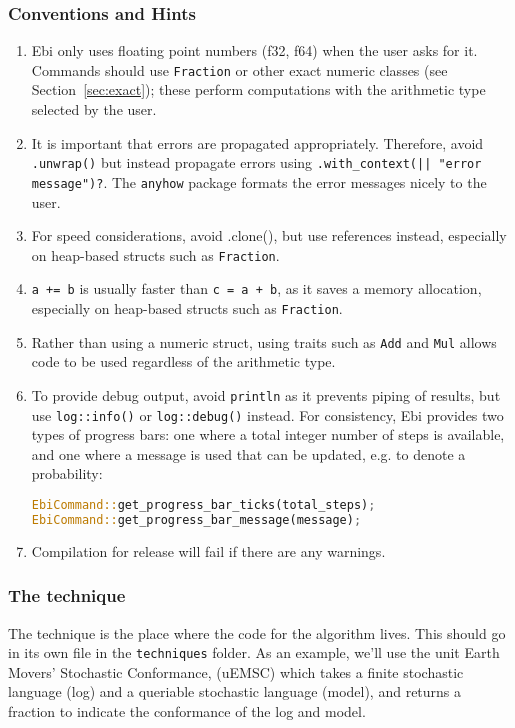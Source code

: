 \documentclass{article}
\begin{document}
		\subsubsection{Conventions and Hints}
			\begin{enumerate}
				\item Ebi only uses floating point numbers (f32, f64) when the user asks for it.
				Commands should use \verb=Fraction= or other exact numeric classes (see Section~\ref{sec:exact}); these perform computations with the arithmetic type selected by the user.
				\item It is important that errors are propagated appropriately.
				Therefore, avoid \verb=.unwrap()= but instead propagate errors using \verb=.with_context(|| "error message")?=.
				The \verb=anyhow= package formats the error messages nicely to the user.
				\item For speed considerations, avoid .clone(), but use references instead, especially on heap-based structs such as \verb=Fraction=.
				\item \verb|a += b| is usually faster than \verb|c = a + b|, as it saves a memory allocation, especially on heap-based structs such as \verb=Fraction=.
				\item Rather than using a numeric struct, using traits such as \verb=Add= and \verb=Mul= allows code to be used regardless of the arithmetic type.
				\item To provide debug output, avoid \verb=println= as it prevents piping of results, but use \verb=log::info()= or \verb=log::debug()= instead.
				For consistency, Ebi provides two types of progress bars: one where a total integer number of steps is available, and one where a message is used that can be updated, e.g. to denote a probability:
\begin{lstlisting}[language=Rust, style=boxed]
EbiCommand::get_progress_bar_ticks(total_steps);
EbiCommand::get_progress_bar_message(message);
\end{lstlisting}
                \item Compilation for release will fail if there are any warnings.
			\end{enumerate}
            
		\subsubsection{The technique}
			The technique is the place where the code for the algorithm lives.
			This should go in its own file in the \verb=techniques= folder.
			As an example, we'll use the unit Earth Movers' Stochastic Conformance, (uEMSC) which takes a finite stochastic language (log) and a queriable stochastic language (model), and returns a fraction to indicate the conformance of the log and model.
			
\end{document}
